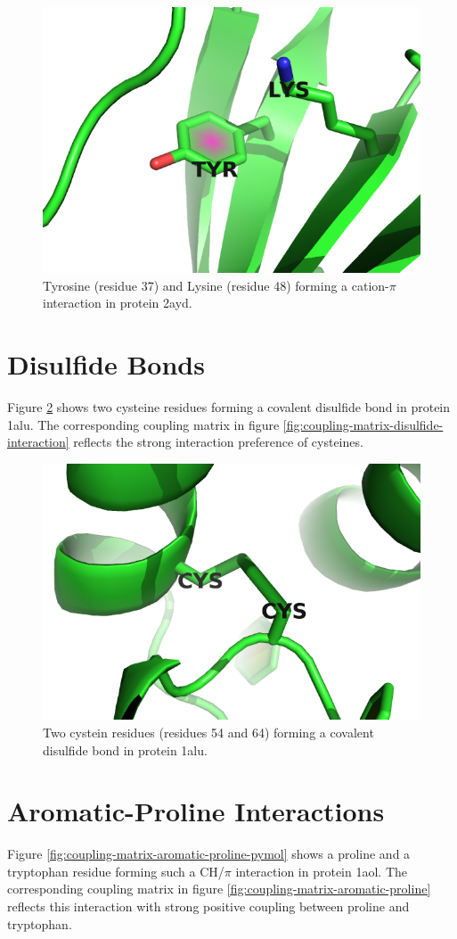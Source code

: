 \documentclass[11pt,a4paper,twoside]{book}
\theoremstyle{definition}
\theoremstyle{definition}
\theoremstyle{remark}
\begin{document}
\begin{figure}
\includegraphics[width=0.5\linewidth]{img/coupling_matrix_analysis/2ayda01_37_48} \caption{Tyrosine (residue 37) and
Lysine (residue 48) forming a cation-\(\pi\) interaction in protein
2ayd.}\label{fig:coupling-matrix-pication-pymol}
\end{figure}

\section{Disulfide Bonds}\label{disulfide}

Figure \ref{fig:coupling-matrix-disulfide-pymol} shows two cysteine
residues forming a covalent disulfide bond in protein 1alu. The
corresponding coupling matrix in figure
\ref{fig:coupling-matrix-disulfide-interaction} reflects the strong
interaction preference of cysteines.




\begin{figure}
\includegraphics[width=0.5\linewidth]{img/coupling_matrix_analysis/1aluA00_54_64} \caption{Two cystein residues
(residues 54 and 64) forming a covalent disulfide bond in protein 1alu.}\label{fig:coupling-matrix-disulfide-pymol}
\end{figure}

\section{Aromatic-Proline Interactions}\label{aromatic-proline}

Figure \ref{fig:coupling-matrix-aromatic-proline-pymol} shows a proline
and a tryptophan residue forming such a CH/\(\pi\) interaction in
protein 1aol. The corresponding coupling matrix in figure
\ref{fig:coupling-matrix-aromatic-proline} reflects this interaction
with strong positive coupling between proline and tryptophan.
\end{document}
